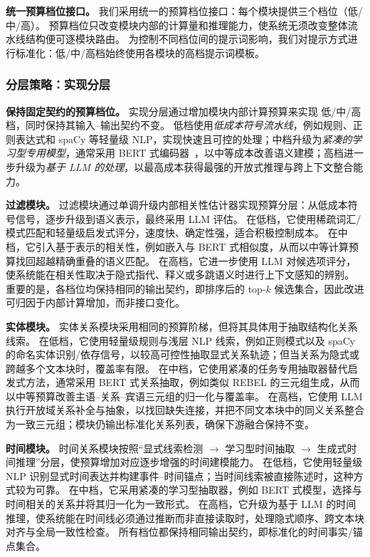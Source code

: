 \textbf{统一预算档位接口。}
我们采用统一的预算档位接口：每个模块提供三个档位（\textsc{低}/\textsc{中}/\textsc{高}）。
预算档位只改变模块内部的计算量和推理能力，使系统无须改变整体流水线结构便可逐模块路由。
为控制不同档位间的提示词影响，我们对提示方式进行标准化：\textsc{低}/\textsc{中}/\textsc{高}档始终使用各模块的\textsc{高}档提示词模板。

\subsubsection{分层策略：实现分层}

\textbf{保持固定契约的预算档位。}
实现分层通过增加模块内部计算预算来实现 \textsc{低}/\textsc{中}/\textsc{高}档，同时保持其输入--输出契约不变。
\textsc{低}档使用\emph{低成本符号流水线}，例如规则、正则表达式和 spaCy 等轻量级 NLP，实现快速且可控的处理；\textsc{中}档升级为\emph{紧凑的学习型专用模型}，通常采用 BERT 式编码器~\citep{devlin2019bert}，以中等成本改善语义建模；\textsc{高}档进一步升级为\emph{基于 LLM 的处理}，以最高成本获得最强的开放式推理与跨上下文整合能力。

\textbf{过滤模块。}
过滤模块通过单调升级内部相关性估计器实现预算分层：从低成本符号信号，逐步升级到语义表示，最终采用 LLM 评估。
在\textsc{低}档，它使用稀疏词汇/模式匹配和轻量级启发式评分，速度快、确定性强，适合积极控制成本。
在\textsc{中}档，它引入基于表示的相关性，例如嵌入与 BERT 式相似度，从而以中等计算预算找回超越精确重叠的语义匹配。
在\textsc{高}档，它进一步使用 LLM 对候选项评分，使系统能在相关性取决于隐式指代、释义或多跳语义时进行上下文感知的辨别。
重要的是，各档位均保持相同的输出契约，即排序后的 top-$k$ 候选集合，因此改进可归因于内部计算增加，而非接口变化。

\textbf{实体模块。}
实体关系模块采用相同的预算阶梯，但将其具体用于抽取结构化关系线索。
在\textsc{低}档，它使用轻量级规则与浅层 NLP 线索，例如正则模式以及 spaCy 的命名实体识别/依存信号，以较高可控性抽取显式关系轨迹；但当关系为隐式或跨越多个文本块时，覆盖率有限。
在\textsc{中}档，它使用紧凑的任务专用抽取器替代启发式方法，通常采用 BERT 式关系抽取，例如类似 REBEL 的三元组生成，从而以中等预算改善主语--关系--宾语三元组的归一化与覆盖率。
在\textsc{高}档，它使用 LLM 执行开放域关系补全与抽象，以找回缺失连接，并把不同文本块中的同义关系整合为一致三元组；模块仍输出标准化关系列表，确保下游融合保持不变。

\textbf{时间模块。}
时间关系模块按照“显式线索检测 $\rightarrow$ 学习型时间抽取 $\rightarrow$ 生成式时间推理”分层，使预算增加对应逐步增强的时间建模能力。
在\textsc{低}档，它使用轻量级 NLP 识别显式时间表达并构建事件--时间锚点；当时间线索被直接陈述时，这种方式较为可靠。
在\textsc{中}档，它采用紧凑的学习型抽取器，例如 BERT 式模型，选择与时间相关的关系并将其归一化为一致形式。
在\textsc{高}档，它升级为基于 LLM 的时间推理，使系统能在时间线必须通过推断而非直接读取时，处理隐式顺序、跨文本块对齐与全局一致性检查。
所有档位都保持相同输出契约，即标准化的时间事实/锚点集合。

